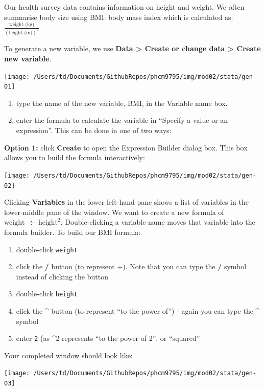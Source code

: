 \documentclass[
]{memoir}
\providecommand{\tightlist}{%
  \setlength{\itemsep}{0pt}\setlength{\parskip}{0pt}}
\begin{document}
Our health survey data contains information on height and weight. We often summarise body size using BMI: body mass index which is calculated as: \(\frac{\text{weight (kg)}}{(\text{height (m)})^2}\)

To generate a new variable, we use \textbf{Data \textgreater{} Create or change data \textgreater{} Create new variable}.

\texttt{[image: /Users/td/Documents/GithubRepos/phcm9795/img/mod02/stata/gen-01]}

\begin{enumerate}
\def\labelenumi{\arabic{enumi})}
\tightlist
\item
  type the name of the new variable, BMI, in the Variable name box.
\item
  enter the formula to calculate the variable in ``Specify a value or an expression''. This can be done in one of two ways:
\end{enumerate}

\textbf{Option 1:} click \textbf{Create} to open the Expression Builder dialog box. This box allows you to build the formula interactively:

\texttt{[image: /Users/td/Documents/GithubRepos/phcm9795/img/mod02/stata/gen-02]}

Clicking \textbf{Variables} in the lower-left-hand pane shows a list of variables in the lower-middle pane of the window. We want to create a new formula of \(\text{weight } \div \text{ height} ^2\). Double-clicking a variable name moves that variable into the formula builder. To build our BMI formula:

\begin{enumerate}
\def\labelenumi{\roman{enumi}.}
\tightlist
\item
  double-click \texttt{weight}
\item
  click the \textbf{/} button (to represent \(\div\)). Note that you can type the \textbf{/} symbol instead of clicking the button
\item
  double-click \texttt{height}
\item
  click the \textbf{\^{}} button (to represent ``to the power of'') - again you can type the \textbf{\^{}} symbol
\item
  enter \texttt{2} (as \^{}2 represents ``to the power of 2'', or ``squared''
\end{enumerate}

Your completed window should look like:

\texttt{[image: /Users/td/Documents/GithubRepos/phcm9795/img/mod02/stata/gen-03]}
\end{document}
